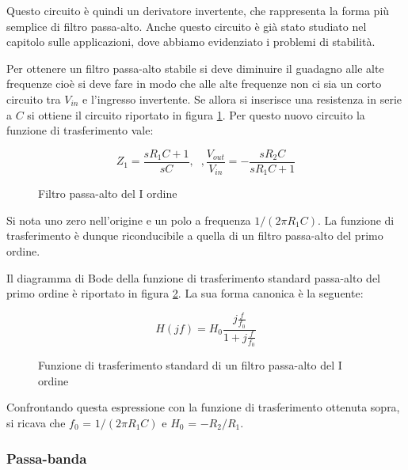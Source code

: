 \documentclass[../main.tex]{subfiles}
\begin{document}
Questo circuito è quindi un derivatore invertente, che rappresenta la forma più semplice di filtro passa-alto. Anche questo circuito è già stato studiato nel
capitolo sulle applicazioni, dove abbiamo evidenziato i problemi di stabilità.

Per ottenere un filtro passa-alto stabile si deve diminuire il guadagno alle alte frequenze cioè si deve fare in modo che alle alte frequenze non ci sia un corto circuito tra $V_{in}$ e l’ingresso invertente. Se allora si inserisce una resistenza in serie a $C$ si ottiene il circuito riportato in figura \ref{filtri08}. Per questo nuovo circuito la funzione di trasferimento vale:

\begin{equation}
	Z_1 = \frac{sR_1C + 1}{sC}, \; \; , \frac{V_{out}}{V_{in}} = - \frac{sR_2C}{sR_1C + 1}
\end{equation}

\begin{figure}
\begin{center}


\label{filtri08}
\caption{Filtro passa-alto del I ordine}	
\end{center}	
\end{figure}

Si nota uno zero nell’origine e un polo a frequenza $1 / (2\pi R_1C)$. La funzione di trasferimento è dunque riconducibile a quella di un filtro passa-alto del primo ordine.

Il diagramma di Bode della funzione di trasferimento standard passa-alto del primo ordine è riportato in figura \ref{filtri09}. La sua forma canonica è la seguente:

\begin{equation}
	H(jf) = H_0 \frac{j \frac{f}{f_0}}{1 + j \frac{f}{f_0}}
\end{equation}


\begin{figure}
\begin{center}


\label{filtri09}
\caption{Funzione di trasferimento standard di un filtro passa-alto del I ordine}	
\end{center}	
\end{figure}

Confrontando questa espressione con la funzione di trasferimento ottenuta sopra, si ricava che $f_0$ = $1 / (2\pi R_1C)$ e $H_0$ = $-R_2 / R_1$.

\subsubsection{Passa-banda}
\end{document}
